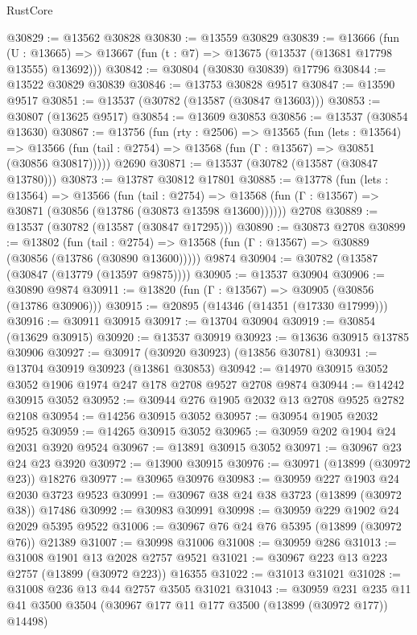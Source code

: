 \begin{lexlean}{RustCore}
\begin{coremodule}
@30829 := @13562 @30828
@30830 := @13559 @30829
@30839 := @13666
    (fun (U : @13665) => @13667 (fun (t : @7) => @13675 (@13537 (@13681 @17798 @13555) @13692)))
@30842 := @30804 (@30830 @30839) @17796
@30844 := @13522 @30829 @30839
@30846 := @13753 @30828 @9517
@30847 := @13590 @9517
@30851 := @13537 (@30782 (@13587 (@30847 @13603)))
@30853 := @30807 (@13625 @9517)
@30854 := @13609 @30853
@30856 := @13537 (@30854 @13630)
@30867 := @13756
    (fun (rty : @2506) =>
    @13565
      (fun (lets : @13564) =>
      @13566 (fun (tail : @2754) => @13568 (fun (Γ : @13567) => @30851 (@30856 @30817)))))
    @2690
@30871 := @13537 (@30782 (@13587 (@30847 @13780)))
@30873 := @13787 @30812 @17801
@30885 := @13778
    (fun (lets : @13564) =>
    @13566
      (fun (tail : @2754) =>
      @13568 (fun (Γ : @13567) => @30871 (@30856 (@13786 (@30873 @13598 @13600))))))
    @2708
@30889 := @13537 (@30782 (@13587 (@30847 @17295)))
@30890 := @30873 @2708
@30899 := @13802
    (fun (tail : @2754) => @13568 (fun (Γ : @13567) => @30889 (@30856 (@13786 (@30890 @13600)))))
    @9874
@30904 := @30782 (@13587 (@30847 (@13779 (@13597 @9875))))
@30905 := @13537 @30904
@30906 := @30890 @9874
@30911 := @13820 (fun (Γ : @13567) => @30905 (@30856 (@13786 @30906)))
@30915 := @20895 (@14346 (@14351 (@17330 @17999)))
@30916 := @30911 @30915
@30917 := @13704 @30904
@30919 := @30854 (@13629 @30915)
@30920 := @13537 @30919
@30923 := @13636 @30915 @13785 @30906
@30927 := @30917 (@30920 @30923) (@13856 @30781)
@30931 := @13704 @30919 @30923 (@13861 @30853)
@30942 := @14970 @30915 @3052 @3052 @1906 @1974 @247 @178 @2708 @9527 @2708 @9874
@30944 := @14242 @30915 @3052
@30952 := @30944 @276 @1905 @2032 @13 @2708 @9525 @2782 @2108
@30954 := @14256 @30915 @3052
@30957 := @30954 @1905 @2032 @9525
@30959 := @14265 @30915 @3052
@30965 := @30959 @202 @1904 @24 @2031 @3920 @9524
@30967 := @13891 @30915 @3052
@30971 := @30967 @23 @24 @23 @3920
@30972 := @13900 @30915
@30976 := @30971 (@13899 (@30972 @23)) @18276
@30977 := @30965 @30976
@30983 := @30959 @227 @1903 @24 @2030 @3723 @9523
@30991 := @30967 @38 @24 @38 @3723 (@13899 (@30972 @38)) @17486
@30992 := @30983 @30991
@30998 := @30959 @229 @1902 @24 @2029 @5395 @9522
@31006 := @30967 @76 @24 @76 @5395 (@13899 (@30972 @76)) @21389
@31007 := @30998 @31006
@31008 := @30959 @286
@31013 := @31008 @1901 @13 @2028 @2757 @9521
@31021 := @30967 @223 @13 @223 @2757 (@13899 (@30972 @223)) @16355
@31022 := @31013 @31021
@31028 := @31008 @236 @13 @44 @2757 @3505 @31021
@31043 := @30959
    @231
    @235
    @11
    @41
    @3500
    @3504
    (@30967 @177 @11 @177 @3500 (@13899 (@30972 @177)) @14498)

\end{coremodule}
\end{lexlean}
